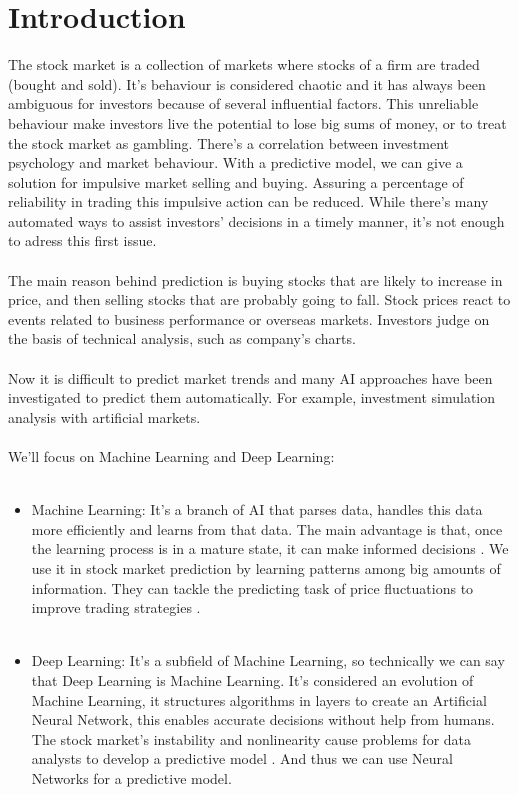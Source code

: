 \documentclass[conference]{IEEEtran}
\begin{document}
\section{Introduction}
The stock market is a collection of markets where stocks of a firm are traded (bought and sold)\cite{M2018}.
It's behaviour is considered chaotic \cite{Singh2016} and it has always been ambiguous for investors
because of several influential factors. This unreliable behaviour make investors live the potential to lose big sums of money, or to treat
the stock market as gambling. There's a correlation between investment psychology and market behaviour. With a predictive model, we can give a 
solution for impulsive market selling and buying. Assuring a percentage of reliability in trading this impulsive action can be reduced. While there's many automated ways to assist investors' decisions
in a timely manner\cite{nabipour2020predicting}, it's not enough to adress this first issue.
\\\\
The main reason behind prediction is buying stocks that are likely to increase in price, and then selling stocks that are probably going to fall\cite{nabipour2020predicting}. 
Stock prices react to events related to business performance or overseas markets. Investors judge on the basis of technical analysis, such as company's charts\cite{Akita2016}.
\\\\
Now it is difficult to predict market trends and many AI approaches
have been investigated to predict them automatically. For example, investment simulation analysis with artificial
 markets\cite{Akita2016}.
\\\\
We'll focus on Machine Learning and Deep Learning:
\\\\
\begin{itemize}
  \item Machine Learning: It's a branch of AI that parses data, handles this data more efficiently and learns from that data. The main advantage is that, once
  the learning process is in a mature state, it can make informed decisions \cite{dey2016machine}. We use it in stock market prediction by learning patterns among big amounts of information.
  They can tackle the predicting task of price fluctuations to improve trading strategies \cite{nabipour2020predicting}.
  \\\\
  \item Deep Learning: It's a subfield of Machine Learning, so technically we can say that Deep Learning is Machine Learning.
  It's considered an evolution of Machine Learning, it structures algorithms in layers to create an Artificial Neural Network, this enables accurate decisions
  without help from humans. The stock market's instability and nonlinearity cause problems for data analysts to develop a predictive model \cite{nabipour2020predicting}. And thus we can use Neural Networks for a predictive model.
\end{itemize}
\end{document}
